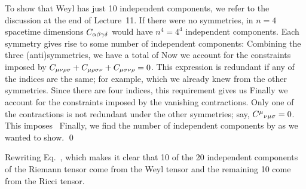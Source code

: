 {	To show that Weyl has just 10 independent components, we refer to the discussion at the end of Lecture~11.  If there were no symmetries, in $n = 4$ spacetime dimensions $C_{\alpha \beta \gamma \delta}$ would have $n^4 = 4^4$ independent components.  Each symmetry gives rise to some number of independent components:
	Combining the three (anti)symmetries, we have a total of
	Now we account for the constraints imposed by $C_{\mu \nu \rho \sigma} + C_{\mu \rho \sigma \nu} + C_{\mu \sigma \nu \rho} = 0$.  This expression is redundant if any of the indices are the same; for example,
	which we already knew from the other symmetries.  Since there are four indices, this requirement gives us
	Finally we account for the constraints imposed by the vanishing contractions.  Only one of the contractions is not redundant under the other symmetries; say, $C^{\mu}{}_{\nu \mu \sigma} = 0$.  This imposes~\cite[p.~146]{Weinberg}
	Finally, we find the number of independent components by
	as we wanted to show. \qed
	
	Rewriting Eq.~,
	which makes it clear that 10 of the 20 independent components of the Riemann tensor come from the Weyl tensor and the remaining 10 come from the Ricci tensor.
}